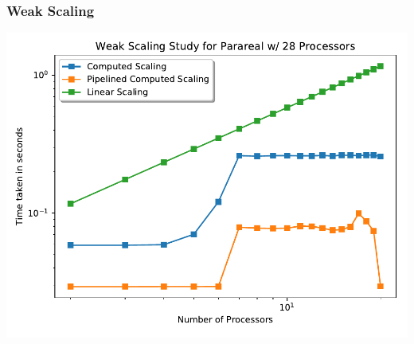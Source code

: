 \documentclass[pdf,12pt]{beamer}
\begin{document}
\begin{frame}
  \frametitle{Weak Scaling}
  \begin{center}
    \includegraphics[width=.8\textwidth]{./resources/weak_scaling}
  \end{center}
\end{frame}
\end{document}
